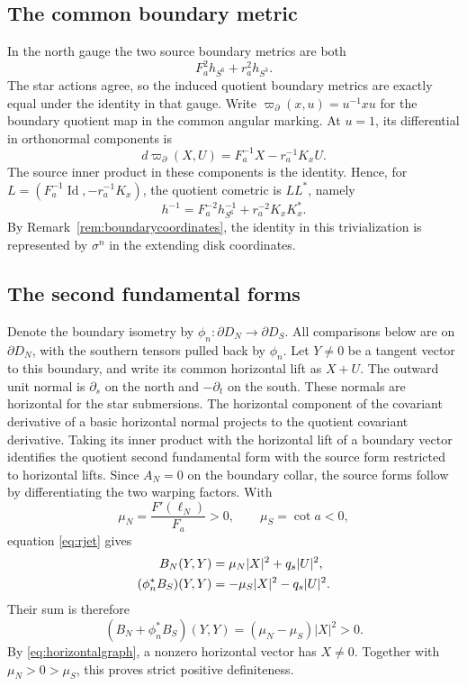 \documentclass[12pt]{amsart}
\numberwithin{equation}{section}
\theoremstyle{remark}
\newcommand{\Id}{\operatorname{Id}}
\begin{document}
\subsection{The common boundary metric}
In the north gauge the two source boundary metrics are both
\begin{equation}\label{eq:sourceboundary}
F_a^2h_{S^6}+r_a^2h_{S^3}.
\end{equation}
The star actions agree, so the induced quotient boundary metrics
are exactly equal under the identity in that gauge.
Write \(\varpi_\partial(x,u)=u^{-1}xu\) for the boundary
quotient map in the common angular marking. At \(u=1\), its
differential in orthonormal components is
\[
d\varpi_\partial(X,U)=F_a^{-1}X-r_a^{-1}K_xU.
\]
The source inner product in these components is the identity.
Hence, for \(L=(F_a^{-1}\Id,-r_a^{-1}K_x)\), the quotient
cometric is \(LL^*\), namely
\begin{equation}\label{eq:cometric}
h^{-1}=F_a^{-2}h_{S^6}^{-1}+r_a^{-2}K_xK_x^*.
\end{equation}
By Remark~\ref{rem:boundarycoordinates}, the identity in this
trivialization is represented by \(\sigma^n\) in the extending disk
coordinates.

\subsection{The second fundamental forms}
Denote the boundary isometry by
\(\phi_n:\partial D_N\to\partial D_S\). All comparisons below are
on \(\partial D_N\), with the southern tensors pulled back by
\(\phi_n\). Let \(Y\ne0\) be a tangent vector to this boundary, and
write its common horizontal lift as \(X+U\). The outward unit
normal is \(\partial_s\) on the north and \(-\partial_t\) on
the south. These normals are horizontal for the star submersions.
The horizontal component of the covariant derivative of a basic
horizontal normal projects to the quotient covariant derivative.
Taking its inner product with the horizontal lift of a boundary
vector identifies the quotient second fundamental form with the
source form restricted to horizontal lifts. Since \(A_N=0\) on the
boundary collar, the source forms follow by differentiating the two
warping factors. With
\[
\mu_N=\frac{F'(\ell_N)}{F_a}>0,\qquad \mu_S=\cot a<0,
\]
equation \eqref{eq:rjet} gives
\begin{align}
B_N(Y,Y)&=\mu_N|X|^2+q_s|U|^2,\notag\\
(\phi_n^*B_S)(Y,Y)&=-\mu_S|X|^2-q_s|U|^2.
\label{eq:forms}
\end{align}
Their sum is therefore
\begin{equation}\label{eq:sum}
(B_N+\phi_n^*B_S)(Y,Y)=(\mu_N-\mu_S)|X|^2>0.
\end{equation}
By \eqref{eq:horizontalgraph}, a nonzero horizontal vector has
\(X\ne0\). Together with \(\mu_N>0>\mu_S\), this proves strict
positive definiteness.
\end{document}
